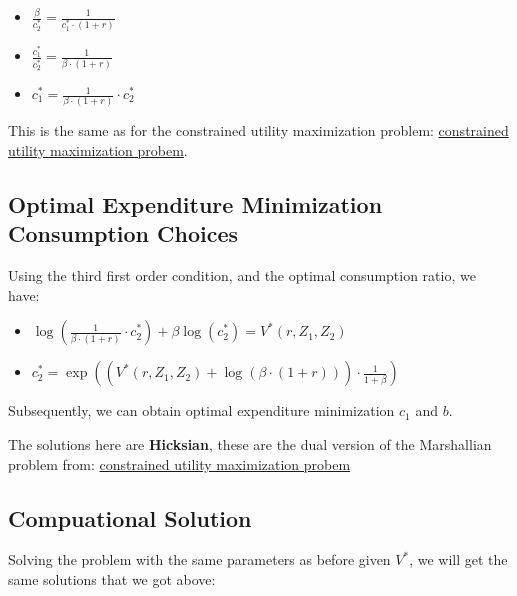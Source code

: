 \documentclass[
]{book}
\begin{document}
\begin{itemize}
\item
  \(\displaystyle \frac{\beta }{c_2^{\ast } }=\frac{1}{c_1^{\ast } \cdot (1+r)}\)
\item
  \(\displaystyle \frac{c_1^{\ast } }{c_2^{\ast } }=\frac{1}{\beta \cdot (1+r)}\)
\item
  \(\displaystyle c_1^{\ast } =\frac{1}{\beta \cdot (1+r)}\cdot c_2^{\ast }\)
\end{itemize}

This is the same as for the constrained utility maximization problem:
\href{https://fanwangecon.github.io/Math4Econ/opti_hh_constrained_brsv/household_c1_c2_constrained.html}{constrained utility maximization
probem}.

\hypertarget{optimal-expenditure-minimization-consumption-choices}{%
\subsection{Optimal Expenditure Minimization Consumption Choices}\label{optimal-expenditure-minimization-consumption-choices}}

Using the third first order condition, and the optimal consumption
ratio, we have:

\begin{itemize}
\item
  \(\displaystyle \log (\frac{1}{\beta \cdot (1+r)}\cdot c_2^{\ast } )+\beta \log (c_2^{\ast } )=V^{\ast } (r,Z_1 ,Z_2 )\)
\item
  \(\displaystyle c_2^{\ast } =\exp \left(\left(V^{\ast } (r,Z_1 ,Z_2 )+\log (\beta \cdot (1+r))\right)\cdot \frac{1}{1+\beta }\right)\)
\end{itemize}

Subsequently, we can obtain optimal expenditure minimization \(c_1\) and
\(b\).

The solutions here are \textbf{Hicksian}, these are the dual version of the
Marshallian problem from: \href{https://fanwangecon.github.io/Math4Econ/opti_hh_constrained_brsv/household_c1_c2_constrained.html}{constrained utility maximization
probem}

\hypertarget{compuational-solution}{%
\subsection{Compuational Solution}\label{compuational-solution}}

Solving the problem with the same parameters as before given \(V^*\), we
will get the same solutions that we got above:
\end{document}

